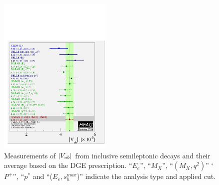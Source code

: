 \begin{figure}
\begin{center}
\includegraphics[width=0.48\textwidth]{figures/slb/vub_clnu_mc_asym_DGE.pdf}
\end{center}
\caption{Measurements of $|V_{ub}|$ from inclusive semileptonic decays 
and their average based on the DGE prescription.
``$E_e$'', ``$M_X$'', ``$(M_X,q^2)$'' `$P^+$'', ``$p^*$ and ``($E_e,s^{max}_h$)'' indicate the 
analysis type and applied cut.}
\label{fig:DGE}
\end{figure}

